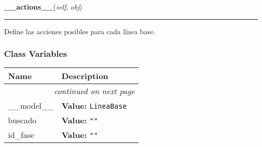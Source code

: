     \label{saip:controllers:linea_base_controller:LineaBaseTableFiller:__actions__}

    \vspace{0.5ex}

\hspace{.8\funcindent}\begin{boxedminipage}{\funcwidth}

    \raggedright \textbf{\_\_actions\_\_}(\textit{self}, \textit{obj})

    \vspace{-1.5ex}

    \rule{\textwidth}{0.5\fboxrule}
\setlength{\parskip}{2ex}
    Define las acciones posibles para cada línea base.

\setlength{\parskip}{1ex}
    \end{boxedminipage}



  \subsubsection{Class Variables}

    \vspace{-1cm}
\hspace{\varindent}\begin{longtable}{|p{\varnamewidth}|p{\vardescrwidth}|l}
\cline{1-2}
\cline{1-2} \centering \textbf{Name} & \centering \textbf{Description}& \\
\cline{1-2}
\endhead\cline{1-2}\multicolumn{3}{r}{\small\textit{continued on next page}}\\\endfoot\cline{1-2}
\endlastfoot\raggedright \_\-\_\-m\-o\-d\-e\-l\-\_\-\_\- & \raggedright \textbf{Value:} 
{\tt LineaBase}&\\
\cline{1-2}
\raggedright b\-u\-s\-c\-a\-d\-o\- & \raggedright \textbf{Value:} 
{\tt ""}&\\
\cline{1-2}
\raggedright i\-d\-\_\-f\-a\-s\-e\- & \raggedright \textbf{Value:} 
{\tt ""}&\\
\cline{1-2}
\end{longtable}

